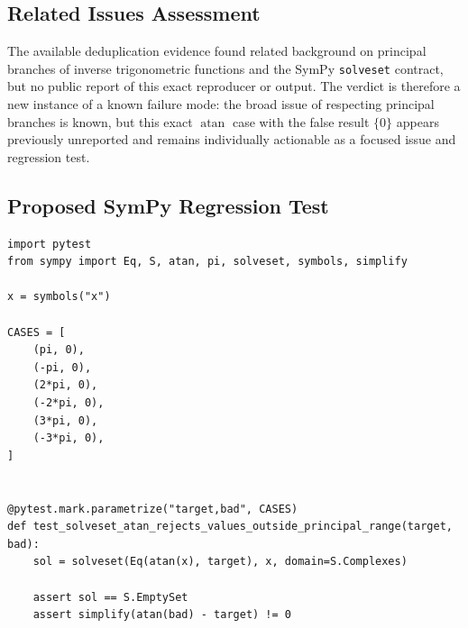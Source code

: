 \documentclass[11pt]{article}
\begin{document}
\subsection{Related Issues Assessment}

The available deduplication evidence found related background on principal
branches of inverse trigonometric functions and the SymPy \texttt{solveset}
contract, but no public report of this exact reproducer or output.  The verdict
is therefore a new instance of a known failure mode: the broad issue of
respecting principal branches is known, but this exact \(\operatorname{atan}\)
case with the false result \(\{0\}\) appears previously unreported and remains
individually actionable as a focused issue and regression test.

\subsection{Proposed SymPy Regression Test}

\medskip

\begin{lstlisting}[style=bugpython]
import pytest
from sympy import Eq, S, atan, pi, solveset, symbols, simplify

x = symbols("x")

CASES = [
    (pi, 0),
    (-pi, 0),
    (2*pi, 0),
    (-2*pi, 0),
    (3*pi, 0),
    (-3*pi, 0),
]


@pytest.mark.parametrize("target,bad", CASES)
def test_solveset_atan_rejects_values_outside_principal_range(target, bad):
    sol = solveset(Eq(atan(x), target), x, domain=S.Complexes)

    assert sol == S.EmptySet
    assert simplify(atan(bad) - target) != 0
\end{lstlisting}
\end{document}
